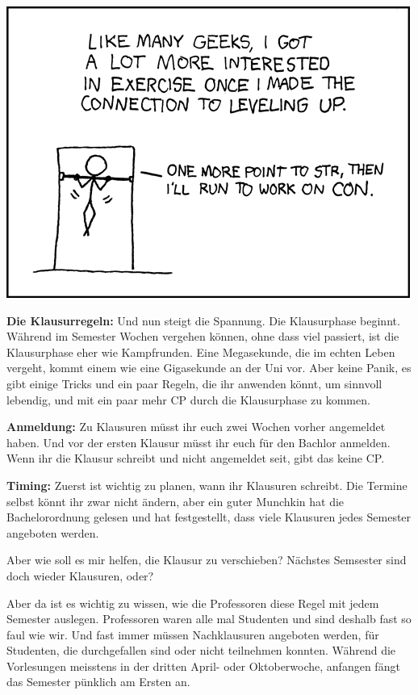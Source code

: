 \begin{center}
\includegraphics[width=\linewidth]{comics/exercise}\\
\end{center}

\textbf{Die Klausurregeln:}
Und nun steigt die Spannung. Die Klausurphase beginnt.
W\"ahrend im Semester Wochen vergehen k\"onnen, ohne dass viel passiert, ist die Klausurphase eher wie Kampfrunden.
Eine Megasekunde, die im echten Leben vergeht, kommt einem wie eine Gigasekunde an der Uni vor.
    Aber keine Panik, es gibt einige Tricks und ein paar Regeln, die ihr
anwenden k\"onnt, um sinnvoll lebendig, und mit ein paar mehr CP durch die
Klausurphase zu kommen.

\textbf{Anmeldung:}
Zu Klausuren m\"usst ihr euch zwei Wochen vorher angemeldet haben. Und vor der ersten Klausur m\"usst ihr euch f\"ur den Bachlor anmelden.
Wenn ihr die Klausur schreibt und nicht angemeldet seit, gibt das keine CP.

\textbf{Timing:}
Zuerst ist wichtig zu planen, wann ihr Klausuren schreibt.
Die Termine selbst k\"onnt ihr zwar nicht \"andern, aber ein guter Munchkin hat die Bachelorordnung gelesen
und hat festgestellt, dass viele Klausuren jedes Semester angeboten werden.

Aber wie soll es mir helfen, die Klausur zu verschieben?
N\"achstes Semsester sind doch wieder Klausuren, oder?

Aber da ist es wichtig
zu wissen, wie die Professoren diese Regel mit jedem Semester auslegen.
Professoren waren alle mal Studenten und sind deshalb fast so faul wie wir.
Und fast immer m\"ussen Nachklausuren angeboten werden, f\"ur Studenten, die durchgefallen sind oder nicht teilnehmen konnten.
W\"ahrend die Vorlesungen meisstens in der dritten April- oder Oktoberwoche, anfangen f\"angt das Semester p\"unklich am Ersten an.


